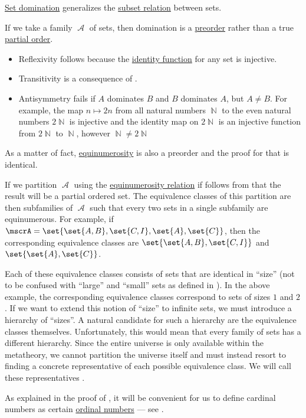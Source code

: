\begin{remark}\label{rem:cardinal_definition}
  \hyperref[def:equinumerosity]{Set domination} generalizes the \hyperref[def:subset]{subset relation} between sets.

  If we take a family \( \mscrA \) of sets, then domination is a \hyperref[def:preordered_set]{preorder} rather than a true \hyperref[def:partially_ordered_set]{partial order}.
  \begin{itemize}
    \item Reflexivity follows because the \hyperref[def:multi_valued_function/identity]{identity function} for any set is injective.
    \item Transitivity is a consequence of .
    \item Antisymmetry fails if \( A \) dominates \( B \) and \( B \) dominates \( A \), but \( A \neq B \). For example, the map \( n \mapsto 2n \) from all natural numbers \( \BbbN \) to the even natural numbers \( 2\BbbN \) is injective and the identity map on \( 2\BbbN \) is an injective function from \( 2\BbbN \) to \( \BbbN \), however \( \BbbN \neq 2\BbbN \)
  \end{itemize}

  As a matter of fact, \hyperref[def:equinumerosity]{equinumerosity} is also a preorder and the proof for that is identical.

  If we partition \( \mscrA \) using the \hyperref[def:equinumerosity]{equinumerosity relation} if follows from  that the result will be a partial ordered set. The equivalence classes of this partition are then subfamilies of \( \mscrA \) such that every two sets in a single subfamily are equinumerous. For example, if \( \mscrA = \set{ \set{ A, B }, \set{ C, I }, \set{ A }, \set{ C } } \), then the corresponding equivalence classes are \( \set{ \set{ A, B }, \set{ C, I } } \) and \( \set{ \set{ A }, \set{ C } } \).

  Each of these equivalence classes consists of sets that are identical in \enquote{size} (not to be confused with \enquote{large} and \enquote{small} sets as defined in ). In the above example, the corresponding equivalence classes correspond to sets of sizes \( 1 \) and \( 2 \). If we want to extend this notion of \enquote{size} to infinite sets, we must introduce a hierarchy of \enquote{sizes}. A natural candidate for such a hierarchy are the equivalence classes themselves. Unfortunately, this would mean that every family of sets has a different hierarchy. Since the entire universe is only available within the metatheory, we cannot partition the universe itself and must instead resort to finding a concrete representative of each possible equivalence class. We will call these representatives .

  As explained in the proof of , it will be convenient for us to define cardinal numbers as certain \hyperref[def:ordinal]{ordinal numbers} --- see .
\end{remark}

